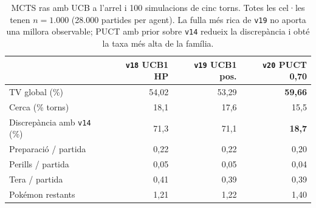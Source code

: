 \begin{table}[htbp]
\centering
\caption{MCTS ras amb UCB a l'arrel i 100 simulacions de cinc torns. Totes les cel·les tenen $n=1.000$ (28.000 partides per agent). La fulla més rica de \texttt{v19} no aporta una millora observable; PUCT amb prior sobre \texttt{v14} redueix la discrepància i obté la taxa més alta de la família.}
\label{tab:mcts_head}
\small
\begin{tabular}{lrrr}
\toprule
 & \textbf{\texttt{v18} UCB1 HP} & \textbf{\texttt{v19} UCB1 pos.} & \textbf{\texttt{v20} PUCT 0,70} \\
\midrule
TV global (\%) & 54,02 & 53,29 & \textbf{59,66} \\
Cerca (\% torns) & 18,1 & 17,6 & 15,5 \\
Discrepància amb \texttt{v14} (\%) & 71,3 & 71,1 & \textbf{18,7} \\
Preparació / partida & 0,22 & 0,22 & 0,20 \\
Perills / partida & 0,05 & 0,05 & 0,04 \\
Tera / partida & 0,41 & 0,39 & 0,39 \\
Pokémon restants & 1,21 & 1,22 & 1,40 \\
\bottomrule
\end{tabular}
\end{table}
